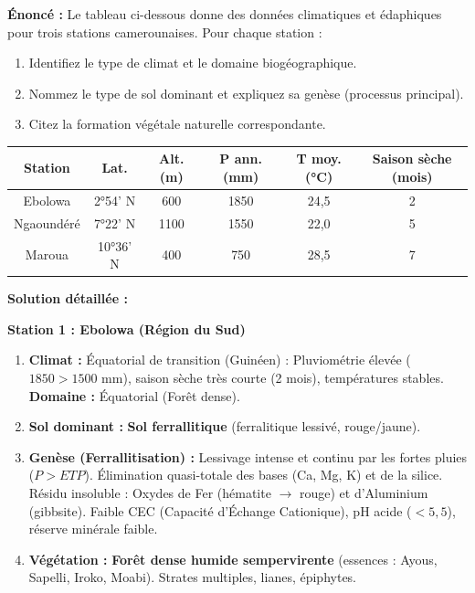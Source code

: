 \documentclass[11pt]{article}
\begin{document}
\begin{exoresolu}
\textbf{Énoncé :} Le tableau ci-dessous donne des données climatiques et édaphiques pour trois stations camerounaises. Pour chaque station :
\begin{enumerate}
    \item Identifiez le type de climat et le domaine biogéographique.
    \item Nommez le type de sol dominant et expliquez sa genèse (processus principal).
    \item Citez la formation végétale naturelle correspondante.
\end{enumerate}
\begin{center}
\begin{tabular}{|c|c|c|c|c|c|}\hline
\textbf{Station} & \textbf{Lat.} & \textbf{Alt. (m)} & \textbf{P ann. (mm)} & \textbf{T moy. (°C)} & \textbf{Saison sèche (mois)} \\ \hline
Ebolowa & 2°54' N & 600 & 1850 & 24,5 & 2 \\ \hline
Ngaoundéré & 7°22' N & 1100 & 1550 & 22,0 & 5 \\ \hline
Maroua & 10°36' N & 400 & 750 & 28,5 & 7 \\ \hline
\end{tabular}
\end{center}
\tcblower
\textbf{Solution détaillée :}

\textbf{Station 1 : Ebolowa (Région du Sud)}
\begin{enumerate}
    \item \textbf{Climat :} Équatorial de transition (Guinéen) : Pluviométrie élevée ($1850 > 1500$ mm), saison sèche très courte (2 mois), températures stables. \textbf{Domaine :} Équatorial (Forêt dense).
    \item \textbf{Sol dominant :} \textbf{Sol ferrallitique} (ferralitique lessivé, rouge/jaune).
    \item \textbf{Genèse (Ferrallitisation) :} Lessivage intense et continu par les fortes pluies ($P > ETP$). Élimination quasi-totale des bases (Ca, Mg, K) et de la silice. Résidu insoluble : Oxydes de Fer (hématite $\rightarrow$ rouge) et d'Aluminium (gibbsite). Faible CEC (Capacité d'Échange Cationique), pH acide ($< 5,5$), réserve minérale faible.
    \item \textbf{Végétation :} \textbf{Forêt dense humide sempervirente} (essences : Ayous, Sapelli, Iroko, Moabi). Strates multiples, lianes, épiphytes.
\end{enumerate}


\end{exoresolu}
\end{document}
